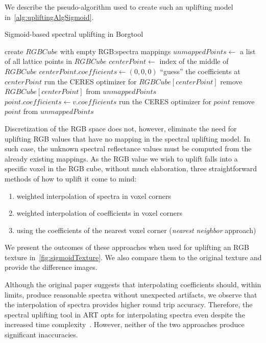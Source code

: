We describe the pseudo-algorithm used to create such an uplifting model in~\cref{alg:upliftingAlgSigmoid}.

\begin{algorithm}[t!]
	\caption{Sigmoid-based spectral uplifting in Borgtool}
	\label{alg:upliftingAlgSigmoid}
	\begin{algorithmic}[1]
		\State create $RGBCube$ with empty RGB:spectra mappings
		\State $unmappedPoints \gets$ a list of all lattice points in $RGBCube$
		\State $centerPoint \gets$ index of the middle of $RGBCube$
		\Statex {}
		\State $centerPoint.coefficients \gets (0,0,0)$
		\Statex \Comment ``guess'' the coefficients at $centerPoint$
		\State run the CERES optimizer for $RGBCube[centerPoint]$
		\State remove $RGBCube[centerPoint]$ from $unmappedPoints$
		\State $point.coefficients \gets v.coefficients$
		\State run the CERES optimizer for $point$
		\State remove $point$ from $unmappedPoints$
		\EndIf
		\EndIf
		\EndFor
		\EndWhile
	\end{algorithmic}
\end{algorithm}

Discretization of the RGB space does not, however, eliminate the need for uplifting RGB values that have no mapping in the spectral uplifting model. In such case, the unknown spectral reflectance values must be computed from the already existing mappings. As the RGB value we wish to uplift falls into a specific voxel in the RGB cube, without much elaboration, three straightforward methods of how to uplift it come to mind:
\begin{enumerate}
	\item weighted interpolation of spectra in voxel corners
	\item weighted interpolation of coefficients in voxel corners
	\item using the coefficients of the nearest voxel corner (\emph{nearest neighbor} approach)
\end{enumerate}

We present the outcomes of these approaches when used for uplifting an RGB texture in~\cref{fig:sigmoidTexture}. We also compare them to the original texture and provide the difference images.

Although the original paper suggests that interpolating coefficients should, within limits, produce reasonable spectra without unexpected artifacts, we observe that the interpolation of spectra provides higher round trip accuracy. Therefore, the spectral uplifting tool in ART opts for interpolating spectra even despite the increased time complexity~\cite{ARTsigmoids}. However, neither of the two approaches produce significant inaccuracies.

